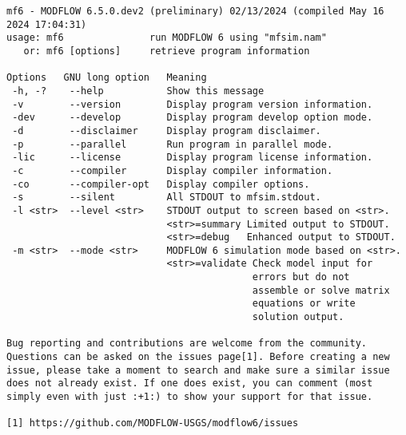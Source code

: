 {\small
\begin{lstlisting}[style=modeloutput]
mf6 - MODFLOW 6.5.0.dev2 (preliminary) 02/13/2024 (compiled May 16 2024 17:04:31)
usage: mf6               run MODFLOW 6 using "mfsim.nam"
   or: mf6 [options]     retrieve program information

Options   GNU long option   Meaning 
 -h, -?    --help           Show this message
 -v        --version        Display program version information.
 -dev      --develop        Display program develop option mode.
 -d        --disclaimer     Display program disclaimer.
 -p        --parallel       Run program in parallel mode.
 -lic      --license        Display program license information.
 -c        --compiler       Display compiler information.
 -co       --compiler-opt   Display compiler options.
 -s        --silent         All STDOUT to mfsim.stdout.
 -l <str>  --level <str>    STDOUT output to screen based on <str>.
                            <str>=summary Limited output to STDOUT.
                            <str>=debug   Enhanced output to STDOUT.
 -m <str>  --mode <str>     MODFLOW 6 simulation mode based on <str>.
                            <str>=validate Check model input for
                                           errors but do not 
                                           assemble or solve matrix 
                                           equations or write 
                                           solution output.
                                                                    
Bug reporting and contributions are welcome from the community. 
Questions can be asked on the issues page[1]. Before creating a new
issue, please take a moment to search and make sure a similar issue
does not already exist. If one does exist, you can comment (most
simply even with just :+1:) to show your support for that issue.
                                                                    
[1] https://github.com/MODFLOW-USGS/modflow6/issues
\end{lstlisting}
}
